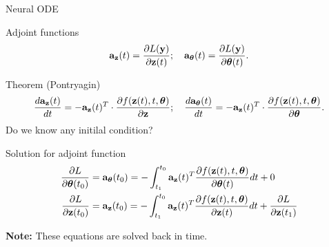 \begin{frame}{Neural ODE}
	\vspace{-0.3cm}
	\begin{block}{Adjoint functions}
		\vspace{-0.3cm}
		\[
		\mathbf{a}_{\mathbf{z}}(t) = \frac{\partial L(\mathbf{y})}{\partial \mathbf{z}(t)}; \quad \mathbf{a}_{\boldsymbol{\theta}}(t) = \frac{\partial L(\mathbf{y})}{\partial \boldsymbol{\theta}(t)}.
		\]
		\vspace{-0.6cm}
	\end{block}
	\begin{block}{Theorem (Pontryagin)}
		\vspace{-0.6cm}
		\[
		\frac{d \mathbf{a}_{\mathbf{z}}(t)}{dt} = - \mathbf{a}_{\mathbf{z}}(t)^T \cdot \frac{\partial f(\mathbf{z}(t), t, \boldsymbol{\theta})}{\partial \mathbf{z}}; \quad \frac{d \mathbf{a}_{\boldsymbol{\theta}}(t)}{dt} = - \mathbf{a}_{\mathbf{z}}(t)^T \cdot \frac{\partial f(\mathbf{z}(t),  t, \boldsymbol{\theta})}{\partial \boldsymbol{\theta}}.
		\]
		Do we know any initilal condition?
	\end{block}
	\begin{block}{Solution for adjoint function}
		\vspace{-0.8cm}
		\begin{align*}
			\frac{\partial L}{\partial \boldsymbol{\theta}(t_0)} &= \mathbf{a}_{\boldsymbol{\theta}}(t_0) =  - \int_{t_1}^{t_0} \mathbf{a}_{\mathbf{z}}(t)^T \frac{\partial f(\mathbf{z}(t), t, \boldsymbol{\theta})}{\partial \boldsymbol{\theta}(t)} dt + 0\\
			\frac{\partial L}{\partial \mathbf{z}(t_0)} &= \mathbf{a}_{\mathbf{z}}(t_0) =  - \int_{t_1}^{t_0} \mathbf{a}_{\mathbf{z}}(t)^T \frac{\partial f(\mathbf{z}(t), t, \boldsymbol{\theta})}{\partial \mathbf{z}(t)} dt + \frac{\partial L}{\partial \mathbf{z}(t_1)}\\
		\end{align*}
		\vspace{-1.2cm}
	\end{block}
	\textbf{Note:} These equations are solved back in time.
\end{frame}
